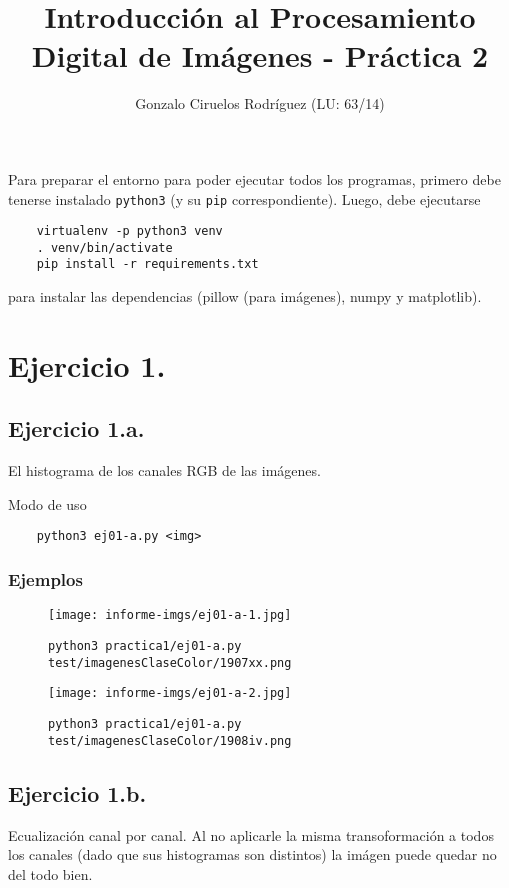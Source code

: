 \documentclass[11pt, spanish]{article}
\title{Introducción al Procesamiento Digital de Imágenes - Práctica 2}
\date{}
\author{Gonzalo Ciruelos Rodríguez (LU: 63/14)}
\begin{document}
\maketitle

Para preparar el entorno para poder ejecutar todos los programas,
primero debe tenerse instalado \texttt{python3} (y su \texttt{pip} correspondiente).
Luego, debe ejecutarse 
\begin{verbatim}
    virtualenv -p python3 venv 
    . venv/bin/activate
    pip install -r requirements.txt 
\end{verbatim}

\noindent para instalar las dependencias (pillow (para imágenes), numpy y matplotlib).



\section{Ejercicio 1.}
\subsection{Ejercicio 1.a.}

El histograma de los canales RGB de las imágenes.

Modo de uso
\begin{verbatim}
    python3 ej01-a.py <img>
\end{verbatim}

\subsubsection*{Ejemplos}
\begin{figure}[H]
\centering
  \texttt{[image: informe-imgs/ej01-a-1.jpg]}
  \caption{\texttt{python3 practica1/ej01-a.py test/imagenesClaseColor/1907xx.png}}
\end{figure}
\begin{figure}[H]
\centering
  \texttt{[image: informe-imgs/ej01-a-2.jpg]}
  \caption{\texttt{python3 practica1/ej01-a.py test/imagenesClaseColor/1908iv.png}}
\end{figure}


\subsection{Ejercicio 1.b.}

Ecualización canal por canal.
Al no aplicarle la misma transoformación a todos los canales (dado que sus histogramas son distintos)
la imágen puede quedar no del todo bien.
\end{document}
